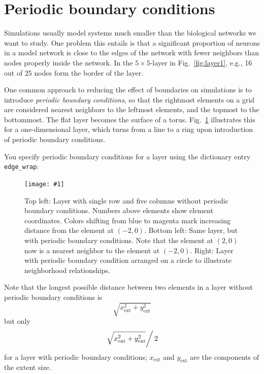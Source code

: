 \documentclass[a4paper,12pt]{report}
\newcommand{\scriptfig}[4]{%
\begin{figure}
\centerline{\texttt{[image: \#1]}}
\caption[#3]{#4}
\label{fig:#1}
\end{figure}%
}
\begin{document}
\section{Periodic boundary conditions}\label{sec:periodic}

Simulations usually model systems much smaller than the biological
networks we want to study. One problem this entails is that a
significant proportion of neurons in a model network is close to the
edges of the network with fewer neighbors than nodes properly inside
the network. In the $5\times 5$-layer in Fig.~\ref{fig:layer1}, e.g.,
16 out of 25 nodes form the border of the layer.

One common approach to reducing the effect of boundaries on
simulations is to introduce \emph{periodic boundary
  conditions}, so that the
rightmost elements on a grid are considered nearest neighbors to the
leftmost elements, and the topmost to the bottommost. The flat layer
becomes the surface of a torus. Fig.~\ref{fig:player} illustrates this
for a one-dimensional layer, which turns from a line to a ring upon
introduction of periodic boundary conditions.

You specify periodic boundary conditions for a layer using the
dictionary entry \lstinline!edge_wrap!:
%

\scriptfig{player}{0.8}{Periodic boundary conditions.}%
{Top left: Layer with single row and five columns without periodic
  boundary conditions. Numbers above elements
  show element coordinates. Colors shifting from blue to magenta mark
  increasing distance from the element at $(-2,0)$.
  Bottom left: Same layer, but with periodic boundary
  conditions.
  Note that the element at $(2,0)$ now is a nearest
  neighbor to the element at $(-2,0)$.
  Right: Layer with periodic boundary condition arranged on a circle
  to illustrate neighborhood relationships.}

Note that the longest possible distance between two elements in a
layer without periodic boundary conditions is
\begin{equation*}
\sqrt{x_{\text{ext}}^2 + y_{\text{ext}}^2}
\end{equation*}
but only
\begin{equation*}
\left.\sqrt{x_{\text{ext}}^2 + y_{\text{ext}}^2}\right/ 2
\end{equation*}
for a layer with periodic boundary conditions; $x_{\text{ext}}$ and
$y_{\text{ext}}$ are the components of the extent size.
\end{document}
